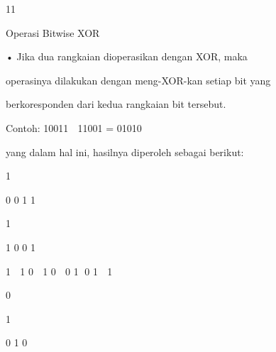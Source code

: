 \documentclass{article}
\begin{document}

11

Operasi Bitwise XOR

• Jika dua rangkaian dioperasikan dengan XOR, maka 

operasinya dilakukan dengan meng-XOR-kan setiap bit yang 

berkoresponden dari kedua rangkaian bit tersebut. 


Contoh: 10011  11001 = 01010 

yang dalam hal ini, hasilnya diperoleh sebagai berikut: 




1 

   0      0       1         1 




1 

   1      0       0         1     


 1  1   0  1  0  0  1 0  1  1  



0 

  1 

     0       1         0
\end{document}
